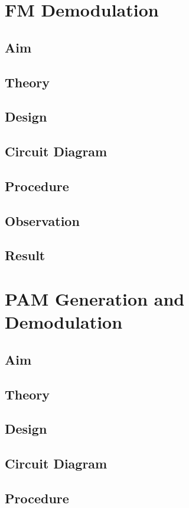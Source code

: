 \documentclass{book}
\begin{document}
\chapter[FM Demodulation]{FM Demodulation}
\section*{Aim}
\section*{Theory}
\section*{Design}
\section*{Circuit Diagram}
\section*{Procedure}
\section*{Observation}
\section*{Result}

\chapter[PAM Generation and Demodulation]{PAM Generation and Demodulation}
\section*{Aim}
\section*{Theory}
\section*{Design}
\section*{Circuit Diagram}
\section*{Procedure}
\end{document}

